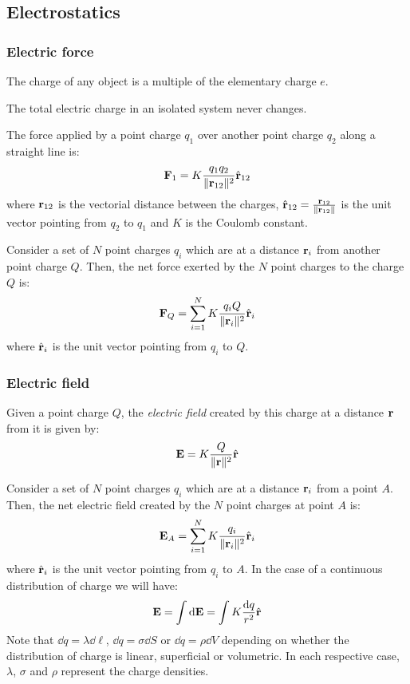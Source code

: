 \documentclass[../../../main.tex]{subfiles}
\begin{document}
\begin{multicols}{2}
  \subsection{Electrostatics}
  \subsubsection{Electric force}
  \begin{prop}
    The charge of any object is a multiple of the elementary charge $e$.
  \end{prop}
  \begin{law}
    The total electric charge in an isolated system never changes.
  \end{law}
  \begin{law}
    The force applied by a point charge $q_1$ over another point charge $q_2$ along a straight line is:
    $$\boldsymbol{\mathrm{F}}_1=K\frac{q_1q_2}{\|\boldsymbol{\mathrm{r}}_{12}\|^2}\hat{\boldsymbol{\mathrm{r}}}_{12}$$
    where $\boldsymbol{\mathrm{r}}_{12}$ is the vectorial distance between the charges, $\hat{\boldsymbol{\mathrm{r}}}_{12}=\frac{\boldsymbol{\mathrm{r}}_{12}}{\|\boldsymbol{\mathrm{r}}_{12}\|}$ is the unit vector pointing from $q_2$ to $q_1$ and $K$ is the Coulomb constant.
  \end{law}
  \begin{principle}
    Consider a set of $N$ point charges $q_i$ which are at a distance $\boldsymbol{\mathrm{r}}_i$ from another point charge $Q$. Then, the net force exerted by the $N$ point charges to the charge $Q$ is:
    $$\boldsymbol{\mathrm{F}}_Q=\sum_{i=1}^NK\frac{q_iQ}{\|\boldsymbol{\mathrm{r}}_{i}\|^2}\hat{\boldsymbol{\mathrm{r}}}_{i}$$ where $\hat{\boldsymbol{\mathrm{r}}}_{i}$ is the unit vector pointing from $q_i$ to $Q$.
  \end{principle}
  \subsubsection{Electric field}
  \begin{definition}
    Given a point charge $Q$, the \emph{electric field} created by this charge at a distance $\boldsymbol{\mathrm{r}}$ from it is given by:
    $$\boldsymbol{\mathrm{E}}=K\frac{Q}{\|\boldsymbol{\mathrm{r}}\|^2}\hat{\boldsymbol{\mathrm{r}}}$$
  \end{definition}
  \begin{principle}
    Consider a set of $N$ point charges $q_i$ which are at a distance $\boldsymbol{\mathrm{r}}_i$ from a point $A$. Then, the net electric field created by the $N$ point charges at point $A$ is:
    $$\boldsymbol{\mathrm{E}}_A=\sum_{i=1}^NK\frac{q_i}{\|\boldsymbol{\mathrm{r}}_{i}\|^2}\hat{\boldsymbol{\mathrm{r}}}_{i}$$ where $\hat{\boldsymbol{\mathrm{r}}}_{i}$ is the unit vector pointing from $q_i$ to $A$. In the case of a continuous distribution of charge we will have:
    $$\boldsymbol{\mathrm{E}}=\int\dd\boldsymbol{\mathrm{E}}=\int K\frac{\dd q}{r^2}\hat{\boldsymbol{\mathrm{r}}}$$
    Note that $\dd q=\lambda\dd \ell$, $\dd q=\sigma\dd S$ or $\dd q=\rho\dd V$ depending on whether the distribution of charge is linear, superficial or volumetric. In each respective case, $\lambda$, $\sigma$ and $\rho$ represent the charge densities.
  \end{principle}

\end{multicols}
\end{document}
